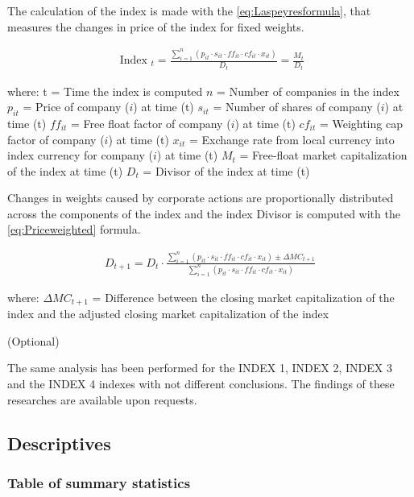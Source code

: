 \documentclass[a4paper, twoside]{templates/ociamthesis}
\begin{document}
\noindent The calculation of the index is made with the \eqref{eq:Laspeyresformula}, that measures the changes in price of the index for fixed weights.

\begin{align}
\text { Index }_{t}=\frac{\sum_{i=1}^{n}\left(p_{i t} \cdot s_{i t} \cdot f f_{i t} \cdot c f_{i t} \cdot x_{i t}\right)}{D_{t}}=\frac{M_{t}}{D_{t}}
\label{eq:Laspeyresformula}
\end{align}

\noindent where: t = Time the index is computed \(n\) = Number of companies in the index \(p_{i t}\) = Price of company (\(i\)) at time (t) \(s_{i t}\) = Number of shares of company (\(i\)) at time (t) \(f f_{i t}\) = Free float factor of company (\(i\)) at time (t) \(c f_{i t}\) = Weighting cap factor of company (\(i\)) at time (t) \(x_{i t}\) = Exchange rate from local currency into index currency for company (\(i\)) at time (t) \(M_{t}\) = Free-float market capitalization of the index at time (t) \(D_{t}\) = Divisor of the index at time (t)

\noindent Changes in weights caused by corporate actions are proportionally distributed across the components of the index and the index Divisor is computed with the \eqref{eq:Priceweighted} formula.

\begin{align}
D_{t+1}=D_{t} \cdot \frac{\sum_{i=1}^{n}\left(p_{i t} \cdot s_{i t} \cdot f f_{i t} \cdot c f_{i t} \cdot x_{i t}\right) \pm \Delta M C_{t+1}}{\sum_{i=1}^{n}\left(p_{i t} \cdot s_{i t} \cdot f f_{i t} \cdot c f_{i t} \cdot x_{i t}\right)}
\label{eq:Priceweighted}
\end{align}

\noindent where: \noindent \(\Delta M C_{t+1}\) = Difference between the closing market capitalization of the index and the adjusted closing market capitalization of the index

(Optional)

The same analysis has been performed for the INDEX 1, INDEX 2, INDEX 3 and the INDEX 4 indexes with not different conclusions. The findings of these researches are available upon requests.

\hypertarget{descriptives}{%
\subsection{Descriptives}\label{descriptives}}

\hypertarget{table-of-summary-statistics}{%
\subsubsection{Table of summary statistics}\label{table-of-summary-statistics}}
\end{document}

